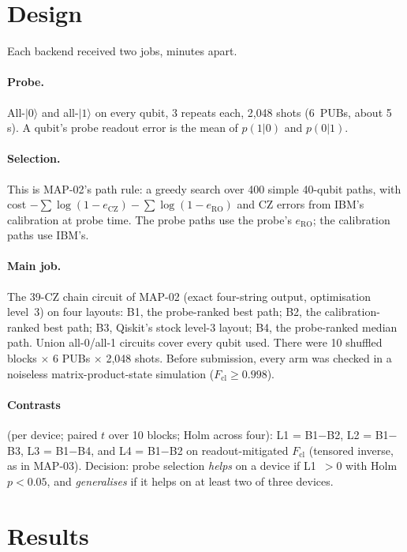 \documentclass[10pt,twocolumn]{article}
\begin{document}
\section{Design}
Each backend received two jobs, minutes apart.

\paragraph{Probe.} All-$|0\rangle$ and all-$|1\rangle$ on every qubit, 3 repeats each, 2{,}048 shots
(6~PUBs, about 5\,s). A qubit's probe readout error is the mean of $p(1|0)$ and $p(0|1)$.

\paragraph{Selection.} This is MAP-02's path rule: a greedy search over 400 simple 40-qubit paths, with
cost $-\sum\log(1-e_{\mathrm{CZ}})-\sum\log(1-e_{\mathrm{RO}})$ and CZ errors from IBM's calibration
at probe time. The probe paths use the probe's $e_{\mathrm{RO}}$; the calibration paths use IBM's.

\paragraph{Main job.} The 39-CZ chain circuit of MAP-02 (exact four-string output, optimisation
level~3) on four layouts: B1, the probe-ranked best path; B2, the calibration-ranked best path; B3,
Qiskit's stock level-3 layout; B4, the probe-ranked median path. Union all-0/all-1 circuits cover
every qubit used. There were 10 shuffled blocks $\times$ 6 PUBs $\times$ 2{,}048 shots. Before
submission, every arm was checked in a noiseless matrix-product-state simulation
($F_{\mathrm{cl}}\ge0.998$).

\paragraph{Contrasts} (per device; paired $t$ over 10 blocks; Holm across four): L1 = B1$-$B2,
L2 = B1$-$B3, L3 = B1$-$B4, and L4 = B1$-$B2 on readout-mitigated $F_{\mathrm{cl}}$ (tensored inverse,
as in MAP-03). Decision: probe selection \emph{helps} on a device if L1~$>0$ with Holm $p<0.05$, and
\emph{generalises} if it helps on at least two of three devices.

\section{Results}
\end{document}
